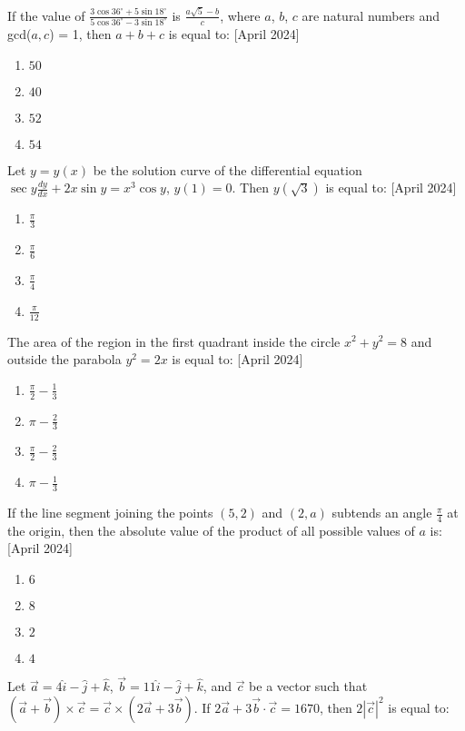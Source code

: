     \item If the value of $\frac{3 \cos 36^\circ + 5 \sin 18^\circ}{5 \cos 36^\circ - 3 \sin 18^\circ}$ is $\frac{a \sqrt{5} - b}{c}$, where $a$, $b$, $c$ are natural numbers and gcd($a, c$) = 1, then $a + b + c$ is equal to:
    \hfill{[April 2024]}
    \begin{enumerate}
        \item $50$
        \item $40$
        \item $52$
        \item $54$
    \end{enumerate}
    \item Let $y = y(x)$ be the solution curve of the differential equation $\sec y \frac{dy}{dx} + 2x \sin y = x^3 \cos y$, $y(1) = 0$. Then $y(\sqrt{3})$ is equal to:
    \hfill{[April 2024]}
    \begin{enumerate}
        \item $\frac{\pi}{3}$
        \item $\frac{\pi}{6}$
        \item $\frac{\pi}{4}$
        \item $\frac{\pi}{12}$
    \end{enumerate}
    \item The area of the region in the first quadrant inside the circle $x^2 + y^2 = 8$ and outside the parabola $y^2 = 2x$ is equal to:
    \hfill{[April 2024]}
    \begin{enumerate}
        \item $\frac{\pi}{2} - \frac{1}{3}$
        \item $\pi - \frac{2}{3}$
        \item $\frac{\pi}{2} - \frac{2}{3}$
        \item $\pi - \frac{1}{3}$
    \end{enumerate}
    \item If the line segment joining the points $(5, 2)$ and $(2, a)$ subtends an angle $\frac{\pi}{4}$ at the origin, then the absolute value of the product of all possible values of $a$ is:
    \hfill{[April 2024]}
    \begin{enumerate}
        \item $6$
        \item $8$
        \item $2$
        \item $4$
    \end{enumerate}
    \item Let $\overrightarrow{a} = 4\hat{i} - \hat{j} + \hat{k}$, $\overrightarrow{b} = 11\hat{i} - \hat{j} + \hat{k}$, and $\overrightarrow{c}$ be a vector such that $(\overrightarrow{a} + \overrightarrow{b}) \times \overrightarrow{c} = \overrightarrow{c} \times (2\overrightarrow{a} + 3\overrightarrow{b})$. If $2\overrightarrow{a} + 3\overrightarrow{b} \cdot \overrightarrow{c} = 1670$, then $2|\overrightarrow{c}|^2$ is equal to:
